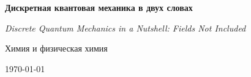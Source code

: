\begin{titlepage}
  \centering
  \vspace*{2cm}
  {\LARGE\bfseries Дискретная квантовая механика в двух словах\par}
  \vspace{0.35cm}
  {\normalsize\itshape Discrete Quantum Mechanics in a Nutshell: Fields Not Included\par}
  \vspace{0.8cm}
  {\Large Химия и физическая химия\par}
  \vfill
  {\large \today\par}
\end{titlepage}
\clearpage

\clearpage
\tableofcontents
\clearpage
